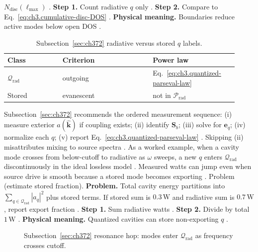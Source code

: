 \(N_{\mathrm{disc}}(\ell_{\max})\) \cite{harrington2001}.
\textbf{Step 1.} Count radiative \(q\) only \cite{jackson1999}.
\textbf{Step 2.} Compare to Eq.~\eqref{eq:ch3.cumulative-disc-DOS} \cite{hansen1988}.
\textbf{Physical meaning.} Boundaries reduce active modes below open DOS \cite{harrington2001}.
\begin{table}[t]
\centering
\caption{Subsection~\ref{sec:ch372} radiative versus stored \(q\) labels.}
\label{tab:ch3.372-radiative-stored}
\small
\begin{tabular}{@{}p{0.22\linewidth}p{0.36\linewidth}p{0.34\linewidth}@{}}
\toprule
Class & Criterion & Power law \\
\midrule
\(\mathcal{Q}_{\mathrm{rad}}\) & outgoing & Eq.~\eqref{eq:ch3.quantized-parseval-law} \\
Stored & evanescent & not in \(\mathcal{P}_{\mathrm{rad}}\) \\
\bottomrule
\end{tabular}
\end{table}
Subsection~\ref{sec:ch372} recommends the ordered measurement sequence: (i) measure exterior \(a(\widehat{\mathbf{k}})\) if coupling exists;
(ii) identify \(\mathbf{S}_{b}\); (iii) solve for \(\mathbf{e}_{q}\); (iv) normalize each \(q\); (v) report
Eq.~\eqref{eq:ch3.quantized-parseval-law} \cite{harrington2001}. Skipping (ii) misattributes mixing to
source spectra \cite{hansen1988}.
As a worked example, when a cavity mode crosses from below-cutoff to radiative as \(\omega\) sweeps, a new \(q\) enters \(\mathcal{Q}_{\mathrm{rad}}\)
discontinuously in the ideal lossless model \cite{jackson1999}. Measured watts can jump even when source drive is smooth
because a stored mode becomes exporting \cite{harrington2001}.
Problem (estimate stored fraction). \textbf{Problem.} Total cavity energy partitions into \(\sum_{q\in\mathcal{Q}_{\mathrm{rad}}}|a_{q}|^{2}\) plus stored terms. If
stored sum is \(0.3\,\mathrm{W}\) and radiative sum is \(0.7\,\mathrm{W}\), report export fraction \cite{poynting1884}.
\textbf{Step 1.} Sum radiative watts \cite{poynting1884}.
\textbf{Step 2.} Divide by total \(1\,\mathrm{W}\) \cite{harrington2001}.
\textbf{Physical meaning.} Quantized cavities can store non-exporting \(q\) \cite{stratton1941}.
\begin{figure}[t]
\centering
{}
\caption{Subsection~\ref{sec:ch372} resonance hop: modes enter \(\mathcal{Q}_{\mathrm{rad}}\) as frequency crosses cutoff.}
\label{fig:ch3.372-resonance-hop}
\end{figure}
